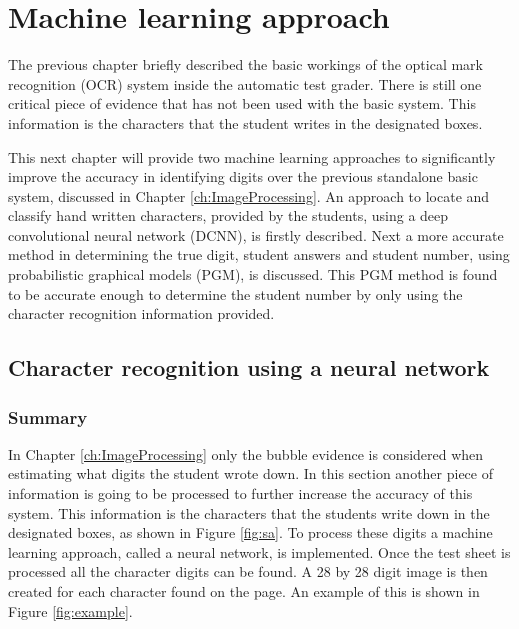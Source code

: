 \chapter{Machine learning approach}
\label{ch:MachineLearning}
\graphicspath{{Chapter4/Chapter4Figures/}}
The previous chapter briefly described the basic workings of the optical mark recognition (OCR) system inside the automatic test grader. There is still one critical piece of evidence that has not been used with the basic system. This information is the characters that the student writes in the designated boxes.

This next chapter will provide two machine learning approaches to significantly improve the accuracy in identifying digits over the previous standalone basic system, discussed in Chapter \ref{ch:ImageProcessing}. An approach to locate and classify hand written characters, provided by the students, using a deep convolutional neural network (DCNN), is firstly described. Next a more accurate method in determining the true digit, student answers and student number, using probabilistic  graphical models (PGM), is discussed. This PGM method is found to be accurate enough to determine the student number by only using the character recognition information provided.

\section{Character recognition using a neural network}

\subsection{Summary}

In Chapter \ref{ch:ImageProcessing} only the bubble evidence is considered when estimating what digits the student wrote down. In this section another piece of information is going to be processed to further increase the accuracy of this system. This information is the characters that the students write down in the designated boxes, as shown in Figure \ref{fig:sa}. To process these digits a machine learning approach, called a neural network, is implemented. Once the test sheet is processed all the character digits can be found. A 28 by 28 digit image is then created for each character found on the page. An example of this is shown in Figure \ref{fig:example}.

